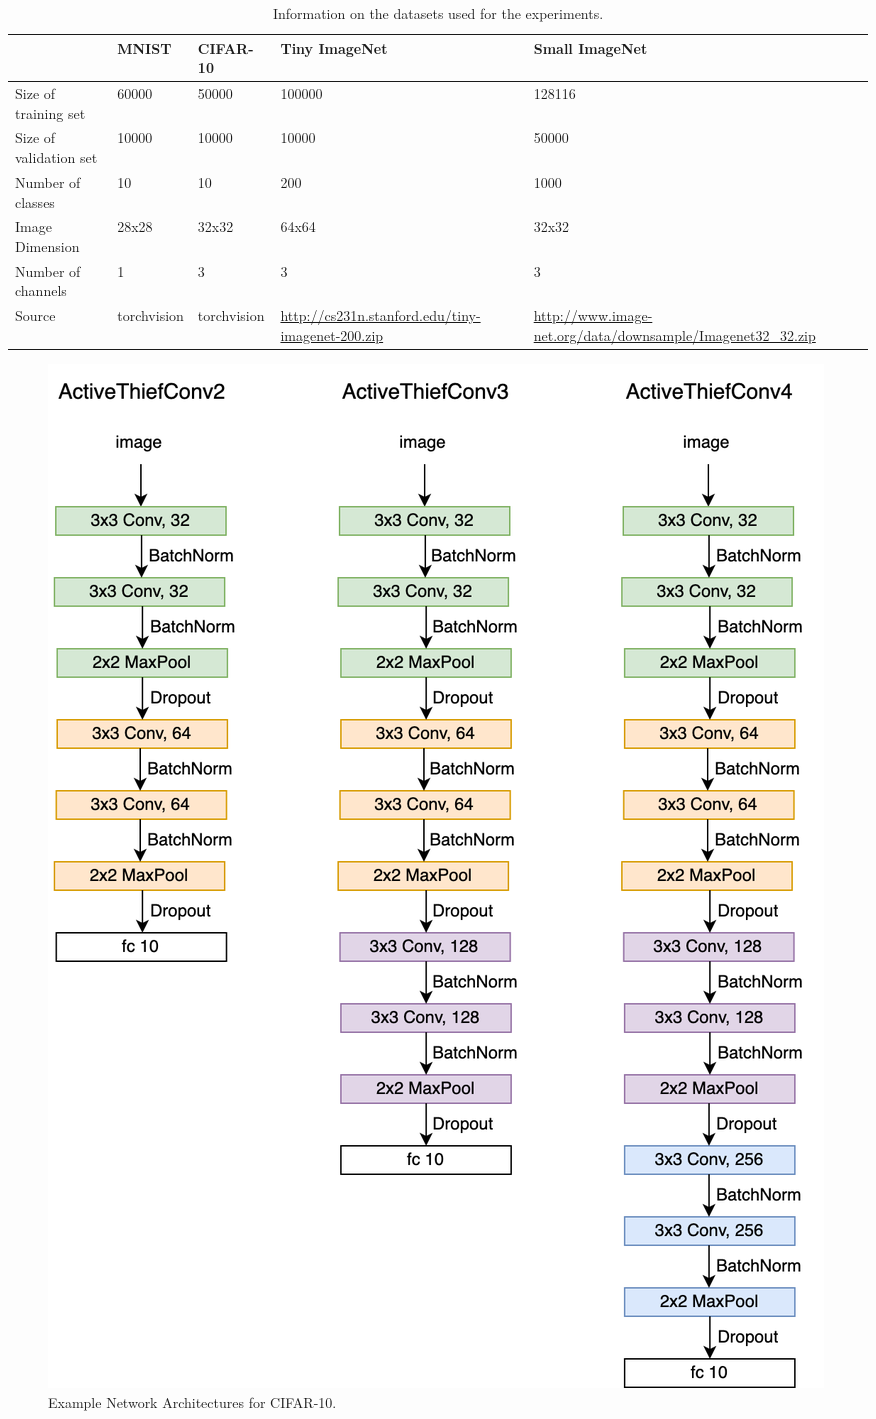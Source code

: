 \begin{table}[h!]
    \centering
    \begin{tabularx}{\textwidth}{|X | X X X X|} 
        \hline
         & MNIST & CIFAR-10 & Tiny \newline ImageNet & Small \newline ImageNet \\ 
        \hline 
        Size of training set & 60000 & 50000 & 100000 & 128116 \\ 
        Size of validation set & 10000 & 10000 & 10000 & 50000\\
        Number of classes & 10 & 10 & 200 & 1000 \\
        Image Dimension & 28x28 & 32x32 & 64x64& 32x32\\
        Number of channels & 1 & 3 & 3 & 3 \\
        Source & torchvision & torchvision & {\small \url{http://cs231n.stanford.edu/tiny-imagenet-200.zip}} & {\small \url{http://www.image-net.org/data/downsample/Imagenet32_32.zip}} \\
        \hline
    \end{tabularx}
    \caption{Information on the datasets used for the experiments.}
    \label{fig:DatasetInformtion}
\end{table}

\begin{figure}[h]
    \centering
    \includegraphics[width=\linewidth]{images/ActiveThiefConvs.png}
    \caption[ActiveThiefConv Architectures]{Example Network Architectures for CIFAR-10.}
    \label{fig:ActiveThiefArchitectures}
\end{figure}



